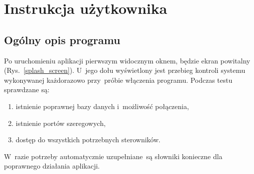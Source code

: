 \section{Instrukcja użytkownika}

\subsection{Ogólny opis programu}

\noindent Po uruchomieniu aplikacji pierwszym widocznym oknem, będzie ekran powitalny (Rys.~\ref{splash_screen}). U~jego dołu wyświetlony jest przebieg kontroli systemu wykonywanej każdorazowo przy~próbie włączenia programu. Podczas testu sprawdzane są:
\begin{enumerate}
\item istnienie poprawnej bazy danych i~możliwość połączenia,
\item istnienie portów szeregowych,
\item dostęp do wszystkich potrzebnych sterowników.
\end{enumerate}
\noindent W~razie potrzeby automatycznie uzupełniane~są słowniki konieczne dla poprawnego działania aplikacji.

